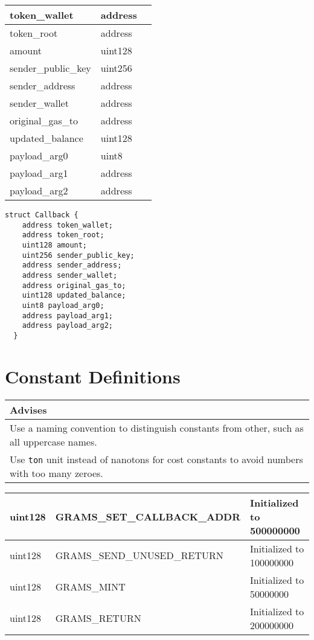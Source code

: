 \ifsoltables
\noindent\begin{tabular}{|l|l|p{6cm}|}\hline
token\_{}wallet & address & \\\hline
token\_{}root & address & \\\hline
amount & uint128 & \\\hline
sender\_{}public\_{}key & uint256 & \\\hline
sender\_{}address & address & \\\hline
sender\_{}wallet & address & \\\hline
original\_{}gas\_{}to & address & \\\hline
updated\_{}balance & uint128 & \\\hline
payload\_{}arg0 & uint8 & \\\hline
payload\_{}arg1 & address & \\\hline
payload\_{}arg2 & address & \\\hline
\end{tabular}
\fi


\begin{lstlisting}[firstnumber=48]
  struct Callback {
    address token_wallet;
    address token_root;
    uint128 amount;
    uint256 sender_public_key;
    address sender_address;
    address sender_wallet;
    address original_gas_to;
    uint128 updated_balance;
    uint8 payload_arg0;
    address payload_arg1;
    address payload_arg2;
  }
\end{lstlisting}

\section{Constant Definitions}


\ifsoldraft
\noindent\begin{tabular}{|p{12cm}|}\hline
\rowcolor{green}Advises
\\\hline
Use a naming convention to distinguish constants from other, such as all uppercase names.
\\\hline
Use \verb+ton+ unit instead of nanotons for cost constants to avoid numbers with too many zeroes.
\\\hline\end{tabular}
\fi

\ifsoltables
\noindent\begin{tabular}{|l|l|p{5cm}|}\hline
uint128 & GRAMS\_{}SET\_{}CALLBACK\_{}ADDR & Initialized to 500000000  \\\hline
uint128 & GRAMS\_{}SEND\_{}UNUSED\_{}RETURN & Initialized to 100000000  \\\hline
uint128 & GRAMS\_{}MINT & Initialized to 50000000  \\\hline
uint128 & GRAMS\_{}RETURN & Initialized to 200000000  \\\hline
\end{tabular}
\fi


